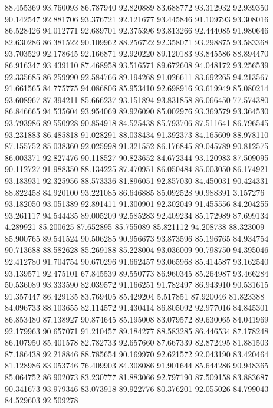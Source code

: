 88.455369
93.760093
86.787940
92.820889
83.688772
93.312932
92.939350
90.142547
92.881706
93.376721
92.121677
93.445846
91.109793
93.308016
86.528426
94.012771
92.689701
92.375396
93.813266
92.444085
91.980646
82.630286
86.381522
90.109962
88.256722
92.358071
93.298875
93.583368
93.703529
92.178645
92.166871
92.920220
89.120183
93.845586
88.894470
86.916347
93.439110
87.468958
93.516571
89.672608
94.048172
93.256539
92.335685
86.259990
92.584766
89.194268
91.026611
83.692265
94.213567
91.661565
84.775775
94.086806
85.953410
92.698916
93.619949
85.080214
93.608967
87.394211
85.666237
93.151894
93.831858
86.066450
77.574380
86.846665
94.535604
93.954069
89.926090
85.002976
93.369579
93.364530
93.793986
89.550928
90.854918
84.525438
85.793706
87.511641
86.796545
93.231883
86.485818
91.028291
88.038434
91.392373
84.165609
88.978110
87.155752
85.038360
92.025998
91.321552
86.176845
89.045789
90.812575
86.003371
92.827476
90.118527
90.823652
84.672344
93.120983
87.509095
90.112727
91.988350
88.134225
87.470951
86.050484
85.003050
86.174921
93.183931
92.325956
88.573336
81.896051
92.857030
84.450031
90.424331
88.822458
84.920100
93.221085
86.646885
85.092528
90.988391
3.157276
93.182050
93.051389
92.891411
91.300901
92.302049
91.455556
84.204255
93.261117
94.544435
89.005209
92.585283
92.409234
85.172989
87.699134
4.289921
85.200625
87.652895
85.755089
85.821112
94.208738
88.323009
85.900765
89.541524
90.506285
90.956673
93.873596
85.196765
84.934754
90.713688
88.582628
85.269188
85.228004
93.036009
90.798750
94.395046
92.412780
91.704754
90.670296
91.662457
93.065968
85.414587
93.162540
93.139571
92.475101
67.845539
89.550773
86.960345
85.264987
93.466284
50.536089
93.333590
82.039572
91.166251
91.782497
86.943910
90.531615
91.357447
86.429135
83.769405
85.429204
5.517851
87.920046
81.823388
84.096733
88.103655
82.114572
91.430414
86.805092
92.977016
84.845301
86.853480
87.138927
90.874645
85.195008
83.079572
89.630065
84.041969
92.179963
90.657071
91.210457
89.184277
88.583285
86.446534
87.178248
86.107950
85.401578
82.782733
92.657660
87.667339
82.872495
81.881503
87.186438
92.218846
88.785654
90.169970
92.621572
92.043190
83.420464
81.128986
83.053746
76.409903
84.308086
91.901644
85.644286
90.948365
85.064752
86.902073
83.230777
81.883066
92.797190
87.509158
83.883687
90.341673
93.979346
83.073918
89.922776
80.376201
92.055026
84.799043
84.529603
92.509278
